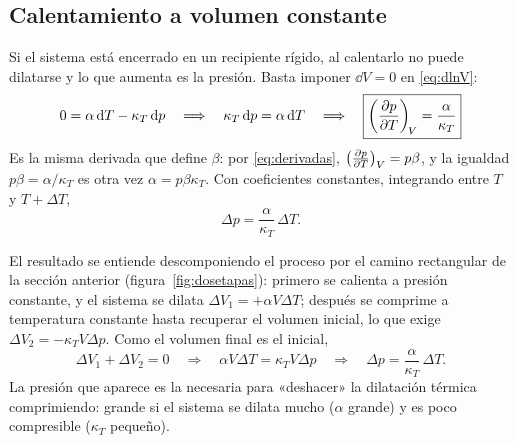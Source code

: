 \subsection{Calentamiento a volumen constante}

Si el sistema está encerrado en un recipiente rígido, al calentarlo no puede dilatarse y lo que
aumenta es la presión. Basta imponer $\dd V=0$ en \eqref{eq:dlnV}:
\[
  0=\alpha\,\mathrm{d} T-\kappa_T\,\mathrm{d} p\quad\Longrightarrow\quad\kappa_T\,\mathrm{d} p=\alpha\,\mathrm{d} T
  \quad\Longrightarrow\quad\boxed{\left(\frac{\partial p}{\partial T}\right)_{\!V}=\frac{\alpha}{\kappa_T}}
\]
Es la misma derivada que define $\beta$: por \eqref{eq:derivadas}, $\bigl(\tfrac{\partial p}{\partial T}\bigr)_{V}=p\beta$, y la igualdad
$p\beta=\alpha/\kappa_T$ es otra vez $\alpha=p\beta\kappa_T$. Con coeficientes constantes, integrando
entre $T$ y $T+\Delta T$,
\begin{equation}\label{eq:Dp}
  \Delta p=\frac{\alpha}{\kappa_T}\,\Delta T.
\end{equation}

 El resultado se entiende descomponiendo el proceso por el camino
rectangular de la sección anterior (figura~\ref{fig:dosetapas}): primero se calienta a presión
constante, y el sistema se dilata $\Delta V_1=+\alpha V\Delta T$; después se comprime a temperatura
constante hasta recuperar el volumen inicial, lo que exige $\Delta V_2=-\kappa_TV\Delta p$. Como el
volumen final es el inicial,
\[
  \Delta V_1+\Delta V_2=0\quad\Longrightarrow\quad\alpha V\Delta T=\kappa_TV\Delta p
  \quad\Longrightarrow\quad\Delta p=\frac{\alpha}{\kappa_T}\,\Delta T.
\]
La presión que aparece es la necesaria para «deshacer» la dilatación térmica comprimiendo: grande si
el sistema se dilata mucho ($\alpha$ grande) y es poco compresible ($\kappa_T$ pequeño).

